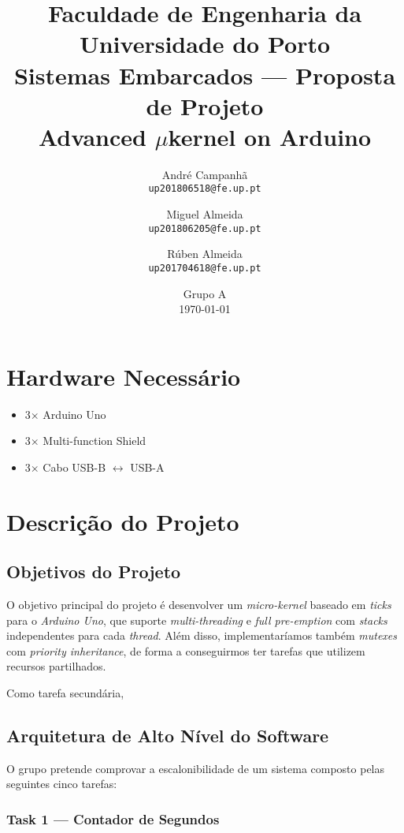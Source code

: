 \documentclass{article}
\title{{\normalsize Faculdade de Engenharia da Universidade do Porto}\\Sistemas Embarcados --- Proposta de Projeto\\\textbf{Advanced $\mu$kernel on Arduino}}
\author{André Campanhã\\\texttt{up201806518@fe.up.pt} \and Miguel Almeida\\\texttt{up201806205@fe.up.pt} \and Rúben Almeida\\\texttt{up201704618@fe.up.pt}}
\date{Grupo A\\\vspace{0.5em}\today}
\begin{document}
\maketitle

\section{Hardware Necessário}

\begin{itemize}
    \item 3$\times$ Arduino Uno
    \item 3$\times$ Multi-function Shield
    \item 3$\times$ Cabo USB-B $\longleftrightarrow$ USB-A
\end{itemize}

\section{Descrição do Projeto}

\subsection{Objetivos do Projeto}

O objetivo principal do projeto é desenvolver um \textit{micro-kernel} baseado em \textit{ticks} para o \textit{Arduino Uno}, que suporte \textit{multi-threading} e \textit{full pre-emption} com \textit{stacks} independentes para cada \textit{thread}. Além disso, implementaríamos também \textit{mutexes} com \textit{priority inheritance}, de forma a conseguirmos ter tarefas que utilizem recursos partilhados.

Como tarefa secundária, 

\subsection{Arquitetura de Alto Nível do Software}

O grupo pretende comprovar a escalonibilidade de um sistema composto pelas seguintes cinco tarefas:

\subsubsection{Task 1 --- Contador de Segundos}
\end{document}
